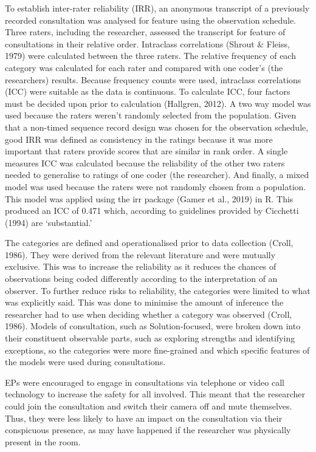 \documentclass[
  english,
  man]{apa7}
\begin{document}
To establish inter-rater reliability (IRR), an anonymous transcript of a previously recorded consultation was analysed for feature using the observation schedule. Three raters, including the researcher, assessed the transcript for feature of consultations in their relative order. Intraclass correlations (Shrout \& Fleiss, 1979) were calculated between the three raters. The relative frequency of each category was calculated for each rater and compared with one coder's (the researchers) results. Because frequency counts were used, intraclass correlations (ICC) were suitable as the data is continuous. To calculate ICC, four factors must be decided upon prior to calculation (Hallgren, 2012). A two way model was used because the raters weren't randomly selected from the population. Given that a non-timed sequence record design was chosen for the observation schedule, good IRR was defined as consistency in the ratings because it was more important that raters provide scores that are similar in rank order. A single measures ICC was calculated because the reliability of the other two raters needed to generalise to ratings of one coder (the researcher). And finally, a mixed model was used because the raters were not randomly chosen from a population. This model was applied using the irr package (Gamer et al., 2019) in R. This produced an ICC of 0.471 which, according to guidelines provided by Cicchetti (1994) are `substantial.'

The categories are defined and operationalised prior to data collection (Croll, 1986). They were derived from the relevant literature and were mutually exclusive. This was to increase the reliability as it reduces the chances of observations being coded differently according to the interpretation of an observer. To further reduce risks to reliability, the categories were limited to what was explicitly said. This was done to minimise the amount of inference the researcher had to use when deciding whether a category was observed (Croll, 1986). Models of consultation, such as Solution-focused, were broken down into their constituent observable parts, such as exploring strengths and identifying exceptions, so the categories were more fine-grained and which specific features of the models were used during consultations.

EPs were encouraged to engage in consultations via telephone or video call technology to increase the safety for all involved. This meant that the researcher could join the consultation and switch their camera off and mute themselves. Thus, they were less likely to have an impact on the consultation via their conspicuous presence, as may have happened if the researcher was physically present in the room.
\end{document}
